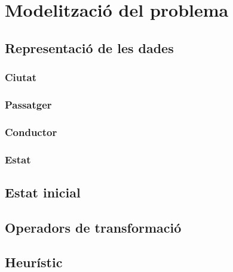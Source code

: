 \section{Modelització del problema}

\subsection{Representació de les dades}
\subsubsection{Ciutat}
\subsubsection{Passatger}
\subsubsection{Conductor}
\subsubsection{Estat}

\subsection{Estat inicial}


\subsection{Operadors de transformació}


\subsection{Heurístic}